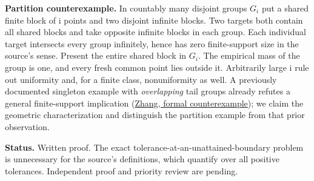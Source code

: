 \documentclass[11pt]{article}
\begin{document}
\textbf{Partition counterexample.} In countably many disjoint groups \(G_{i}\) put a shared finite block of i points and two disjoint infinite blocks. Two targets both contain all shared blocks and take opposite infinite blocks in each group. Each individual target intersects every group infinitely, hence has zero finite-support size in the source's sense. Present the entire shared block in \(G_{i}\). The empirical mass of the group is one, and every fresh common point lies outside it. Arbitrarily large i rule out uniformity and, for a finite class, nonuniformity as well. A previously documented singleton example with \emph{overlapping} tail groups already refutes a general finite-support implication (\href{https://github.com/pengzhang91/generation-in-the-limit-lib/blob/main/GenLimitLean/GenLimit/Paper09_RepresentativeLanguageGeneration/TailCounterexample.lean}{Zhang, formal counterexample}); we claim the geometric characterization and distinguish the partition example from that prior observation.

\textbf{Status.} Written proof. The exact tolerance-at-an-unattained-boundary problem is unnecessary for the source's definitions, which quantify over all positive tolerances. Independent proof and priority review are pending.
\end{document}
